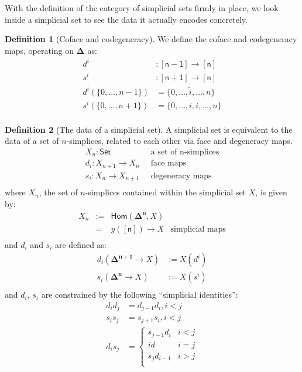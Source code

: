 \documentclass[10pt]{amsart}
\newcommand{\8}{\ensuremath{\infty}}
\newcommand{\0}{\ensuremath{\overset{\rightarrow}{0}}}
\newcommand{\1}{\ensuremath{\mathbf{1}}}
\newcommand{\Set}{\ensuremath{\mathsf{Set}}}
\newcommand{\Hom}{\ensuremath{\mathsf{Hom}}}
\newcommand{\Simplex}[1]{\ensuremath{\boldsymbol{\Delta^{#1}}}}
\newcommand{\sq}[1]{\ensuremath{\mathsf{[#1]}}}
\theoremstyle{definition}
\newtheorem{definition}{Definition}[section]
\numberwithin{definition}{subsection}
\numberwithin{definition}{section}
\begin{document}
With the definition of the category of simplicial sets firmly in place, we look inside a simplicial set to see the data it actually encodes concretely.

\begin{definition}[Coface and codegeneracy]
  We define the coface and codegeneracy maps, operating on \Simplex{} as:
  \begin{align*}
    d^i                       & : \sq{n - 1} \rightarrow \sq{n}     \\
    s^i                       & : \sq{n + 1} \rightarrow \sq{n}     \\
    d^i(\{0, \ldots, n - 1\}) & = \{0, \ldots, \hat{i}, \ldots, n\} \\
    s^i(\{0, \ldots, n + 1\}) & = \{0, \ldots, i, i, \ldots, n\}    \\
  \end{align*}
\end{definition}

\begin{definition}[The data of a simplicial set]
  A simplicial set is equivalent to the data of a set of $n$-simplices, related to each other via face and degeneracy maps.
  \begin{align*}
    X_n : \Set                      & \;\;\text{a set of n-simplices} \\
    d_i : X_{n + 1} \rightarrow X_n & \;\;\text{face maps}            \\
    s_i : X_n \rightarrow X_{n + 1} & \;\;\text{degeneracy maps}      \\
  \end{align*}
  where $X_n$, the set of $n$-simplices contained within the simplicial set $X$, is given by:
  \begin{equation*}
    \begin{matrix}
      X_n & := & \Hom(\Simplex{n}, X)    &                        \\
          & =  & y(\sq{n}) \rightarrow X & \text{simplicial maps} \\
    \end{matrix}
  \end{equation*}
  and $d_i$ and $s_i$ are defined as:
  \begin{align*}
    d_i(\Simplex{n + 1} \rightarrow X) & := X(d^i) \\
    s_i(\Simplex{n} \rightarrow X)     & := X(s^i) \\
  \end{align*}
  and $d_i$, $s_i$ are constrained by the following ``simplicial identities'':
  \begin{align*}
    d_i d_j & = d_{j - 1} d_i, i < j \\
    s_i s_j & = s_{j + 1} s_i, i < j \\
    d_i s_j & =
    \begin{cases}
      s_{j - 1} d_i & i < j \\
      id            & i = j \\
      s_j d_{i - 1} & i > j \\
    \end{cases}
  \end{align*}
\end{definition}
\end{document}
